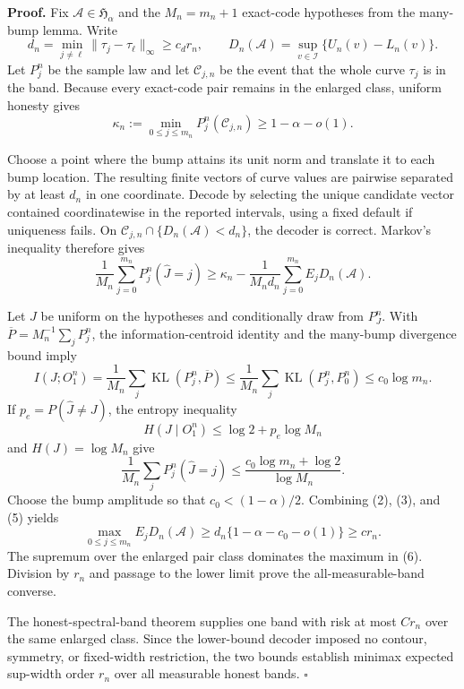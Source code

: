 \textbf{Proof.}
Fix \(\mathcal A\in\mathfrak H_\alpha\) and the \(M_n=m_n+1\) exact-code hypotheses from the many-bump lemma. Write
\[
 d_n=\min_{j\ne\ell}\|\tau_j-\tau_\ell\|_\infty\ge c_dr_n,
 \qquad
 D_n(\mathcal A)=\sup_{v\in\mathcal I}\{U_n(v)-L_n(v)\}. \tag{1}
\]
Let \(P_j^n\) be the sample law and let \(\mathcal C_{j,n}\) be the event that the whole curve \(\tau_j\) is in the band. Because every exact-code pair remains in the enlarged class, uniform honesty gives
\[
 \kappa_n:=\min_{0\le j\le m_n}P_j^n(\mathcal C_{j,n})
 \ge1-\alpha-o(1). \tag{2}
\]

Choose a point where the bump attains its unit norm and translate it to each bump location. The resulting finite vectors of curve values are pairwise separated by at least \(d_n\) in one coordinate. Decode by selecting the unique candidate vector contained coordinatewise in the reported intervals, using a fixed default if uniqueness fails. On \(\mathcal C_{j,n}\cap\{D_n(\mathcal A)<d_n\}\), the decoder is correct. Markov's inequality therefore gives
\[
 \frac1{M_n}\sum_{j=0}^{m_n}P_j^n(\widehat J=j)
 \ge\kappa_n-\frac1{M_nd_n}
 \sum_{j=0}^{m_n}E_jD_n(\mathcal A). \tag{3}
\]

Let \(J\) be uniform on the hypotheses and conditionally draw from \(P_J^n\). With \(\overline P=M_n^{-1}\sum_jP_j^n\), the information-centroid identity and the many-bump divergence bound imply
\[
 I(J;O_1^n)
 =\frac1{M_n}\sum_j\operatorname{KL}(P_j^n,\overline P)
 \le\frac1{M_n}\sum_j\operatorname{KL}(P_j^n,P_0^n)
 \le c_0\log m_n. \tag{4}
\]
If \(p_e=P(\widehat J\ne J)\), the entropy inequality
\[
 H(J\mid O_1^n)\le\log2+p_e\log M_n
\]
and \(H(J)=\log M_n\) give
\[
 \frac1{M_n}\sum_jP_j^n(\widehat J=j)
 \le\frac{c_0\log m_n+\log2}{\log M_n}. \tag{5}
\]
Choose the bump amplitude so that \(c_0<(1-\alpha)/2\). Combining (2), (3), and (5) yields
\[
 \max_{0\le j\le m_n}E_jD_n(\mathcal A)
 \ge d_n\{1-\alpha-c_0-o(1)\}\ge cr_n. \tag{6}
\]
The supremum over the enlarged pair class dominates the maximum in (6). Division by \(r_n\) and passage to the lower limit prove the all-measurable-band converse.

The honest-spectral-band theorem supplies one band with risk at most \(Cr_n\) over the same enlarged class. Since the lower-bound decoder imposed no contour, symmetry, or fixed-width restriction, the two bounds establish minimax expected sup-width order \(r_n\) over all measurable honest bands. \(\square\)